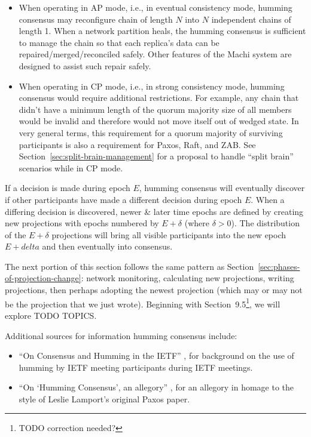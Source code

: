 \documentclass[preprint,10pt]{sigplanconf}
\begin{document}
\begin{itemize}

\item When operating in AP mode, i.e., in eventual consistency mode, humming
consensus may reconfigure chain of length $N$ into $N$
independent chains of length 1.  When a network partition heals, the
humming consensus is sufficient to manage the chain so that each
replica's data can be repaired/merged/reconciled safely.
Other features of the Machi system are designed to assist such
repair safely.

\item When operating in CP mode, i.e., in strong consistency mode, humming
consensus would require additional restrictions.  For example, any
chain that didn't have a minimum length of the quorum majority size of
all members would be invalid and therefore would not move itself out
of wedged state.  In very general terms, this requirement for a quorum
majority of surviving participants is also a requirement for Paxos,
Raft, and ZAB. See Section~\ref{sec:split-brain-management} for a
proposal to handle ``split brain'' scenarios while in CP mode.

\end{itemize}

If a decision is made during epoch $E$, humming consensus will
eventually discover if other participants have made a different
decision during epoch $E$.  When a differing decision is discovered,
newer \& later time epochs are defined by creating new projections
with epochs numbered by $E+\delta$ (where $\delta > 0$).
The distribution of the $E+\delta$ projections will bring all visible
participants into the new epoch $E+delta$ and then eventually into consensus.

The next portion of this section follows the same pattern as
Section~\ref{sec:phases-of-projection-change}: network monitoring,
calculating new projections, writing projections, then perhaps
adopting the newest projection (which may or may not be the projection
that we just wrote).
Beginning with Section~9.5\footnote{TODO correction needed?}, we will
explore TODO TOPICS.

Additional sources for information humming consensus include:

\begin{itemize}
\item ``On Consensus and Humming in the IETF'' \cite{rfc-7282}, for
background on the use of humming by IETF meeting participants during
IETF meetings.

\item ``On `Humming Consensus', an allegory'' \cite{humming-consensus-allegory},
for an allegory in homage to the style of Leslie Lamport's original Paxos
paper.
\end{itemize}
\end{document}
